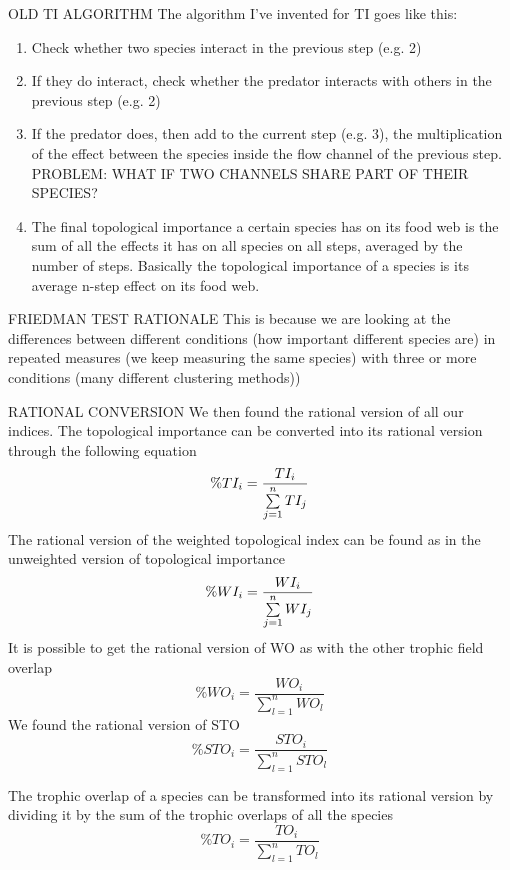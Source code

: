 OLD TI ALGORITHM
The algorithm I've invented for TI goes like this:
            \begin{enumerate}
                \item Check whether two species interact in the previous step (e.g. 2)
                \item If they do interact, check whether the predator interacts with others in the previous step (e.g. 2)
                \item If the predator does, then add to the current step (e.g. 3), the multiplication of the effect between the species inside the flow channel of the previous step. PROBLEM: WHAT IF TWO CHANNELS SHARE PART OF THEIR SPECIES?
                \item The final topological importance a certain species has on its food web is the sum of all the effects it has on all species on all steps, averaged by the number of steps. Basically the topological importance of a species is its average n-step effect on its food web.
            \end{enumerate}

FRIEDMAN TEST RATIONALE
This is because we are looking at the differences between different conditions (how important different species are) in repeated measures (we keep measuring the same species) with three or more conditions (many different clustering methods))

RATIONAL CONVERSION
        We then found the rational version of all our indices. The topological importance can be converted into its rational version through the following equation
        \begin{equation}
            \%TI_i=\frac{TI_i}{\sum\limits\limits_{j=1}^{n} TI_j}
        \end{equation}
        The rational version of the weighted topological index can be found as in the unweighted version of topological importance
        \begin{equation}
            \%WI_i=\frac{WI_i}{\sum\limits\limits_{j=1}^{n} WI_j}
        \end{equation}
        It is possible to get the rational version of WO as with the other trophic field overlap
        \begin{equation}
            \%WO_i=\frac{WO_i}{\sum\limits_{l=1}^n WO_l}
        \end{equation}
        We found the rational version of STO
        \begin{equation}
            \%STO_i=\frac{STO_i}{\sum\limits_{l=1}^n STO_l}
        \end{equation}
        \par The trophic overlap of a species can be transformed into its rational version by dividing it by the sum of the trophic overlaps of all the species
        \begin{equation}
            \%TO_i=\frac{TO_i}{\sum\limits_{l=1}^n TO_l}
        \end{equation}


